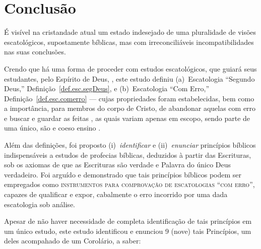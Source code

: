 
\section{Conclusão}

    É visível na cristandade atual um estado indesejado de uma pluralidade de visões escatológicos, supostamente  bíblicas,  mas
    com irreconciliáveis incompatibilidades nas suas conclusões.

    Crendo que há uma forma  de proceder com
    estudos escatológicos, que guiará seus estudantes, pelo Espírito de Deus, ,  este  estudo
    definiu   (a)~Escatologia   ``Segundo   Deus,''   Definição~\ref{def.esc.segDeus},   e   (b)~Escatologia    ``Com    Erro,''
    Definição~\ref{def.esc.comerro} --- cujas propriedades foram estabelecidas, bem como a importância, para membros do corpo de
    Cristo, de abandonar aquelas com erro e buscar e guardar as feitas , as quais variam apenas em  escopo,
    sendo parte de uma único, são e coeso ensino .

    Além das definições, foi proposto (i)~\emph{identificar} e (ii)~\emph{enunciar} princípios bíblicos indispensáveis a estudos
     de profecias bíblicas, deduzidos à partir  das
    Escrituras, sob os axiomas de que as Escrituras são verdade e Palavra do único Deus verdadeiro. Foi arguído e demonstrado
    que tais princípios bíblicos podem ser empregados como \textsc{instrumentos para comprovação de escatologias ``com erro''},
    capazes de qualificar e expor, cabalmente o erro incorrido por uma dada escatologia sob análise.

    Apesar de não haver necessidade de completa identificação de tais princípios em um único estudo, este estudo  identificou  e
    enunciou 9 (nove) tais Princípios, um deles acompahado de um Corolário, a saber:

